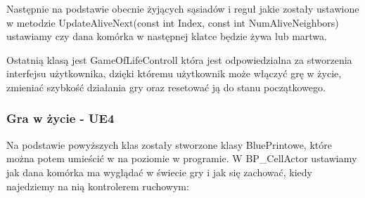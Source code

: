 \documentclass[a4paper,12pt,reqno]{article}
\begin{document}


Następnie na podstawie obecnie żyjących sąsiadów i reguł jakie zostały ustawione w metodzie UpdateAliveNext(const int Index, const int NumAliveNeighbors) ustawiamy czy dana komórka w następnej klatce będzie żywa lub martwa.



Ostatnią klasą jest GameOfLifeControll która jest odpowiedzialna
za stworzenia interfejsu użytkownika, dzięki któremu użytkownik może włączyć grę w życie, zmieniać szybkość działania gry oraz resetować ją do stanu początkowego.
\subsubsection{Gra w życie - UE4}

Na podstawie powyższych klas zostały stworzone klasy BluePrintowe, które można potem umieścić w na poziomie w programie. W BP\_CellActor ustawiamy jak dana komórka ma wyglądać w świecie gry i jak się zachować, kiedy najedziemy na nią kontrolerem ruchowym:
\end{document}
